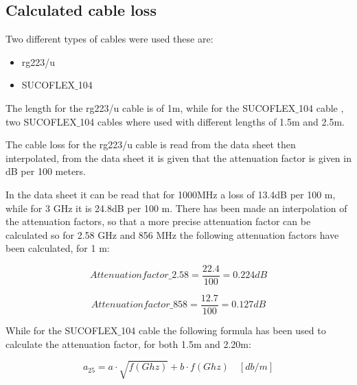 \subsection{Calculated cable loss}
Two different types of cables were used these are:

\begin{itemize}
\item rg223/u 
\item SUCOFLEX$\_$104
\end{itemize}

The length for the  rg223/u \citep{rg} cable is of 1m, while for the SUCOFLEX$\_$104 cable \citep{sucoflex_104}, two SUCOFLEX$\_$104 cables where used with different lengths of 1.5m and 2.5m.

The cable loss for the rg223/u cable is read from the data sheet then interpolated, from the data sheet it is given that the attenuation factor is given in dB per 100 meters. 


In the data sheet it can be read that for 1000MHz a loss of  13.4dB per 100 m, while for 3 GHz it is 24.8dB per 100 m. There has been made an interpolation of the attenuation factors, so that a more precise attenuation factor can be calculated so for 2.58 GHz and 856 MHz the following attenuation factors have been calculated, for 1 m:

\begin{equation}
Attenuation factor\_2.58 = \frac{22.4}{100}  = 0.224dB
\end{equation}

\begin{equation}
Attenuation factor\_858 = \frac{12.7}{100}  = 0.127dB
\end{equation}

While for the SUCOFLEX$\_$104 cable the following formula has been used to calculate the attenuation factor, for both 1.5m and 2.20m:

\begin{equation}
a_{25} = a\cdot \sqrt{f(Ghz)} + b \cdot f(Ghz) \quad [db/m]
\end{equation}

\begin{where}
\end{where}

